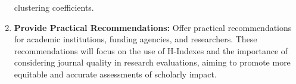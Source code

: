 \begin{enumerate}
            clustering coefficients.
      \item \textbf{Provide Practical Recommendations:} Offer practical recommendations for academic institutions,
            funding agencies, and researchers. These recommendations will focus on the use of H-Indexes and the importance of
            considering journal quality in research evaluations, aiming to promote more equitable and accurate assessments of scholarly impact.
\end{enumerate}

